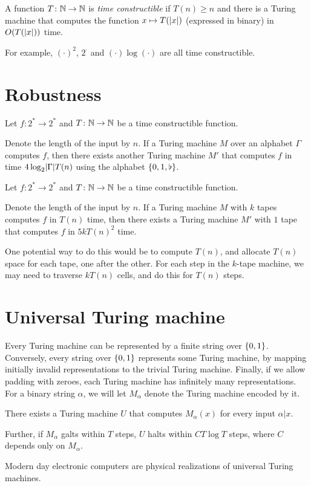 \begin{definition*} \label{def:tcf}
    A function $T\colon \mathbb{N} \to \mathbb{N}$ is \emph{time constructible} if
    $T(n) \ge n$ and there is a Turing machine that computes the function
    $x \mapsto T(\lvert x\rvert)$ (expressed in binary) in $O(T(\lvert x\rvert))$ time.
\end{definition*}
For example, $(\cdot)^2$, $2^\cdot$ and $(\cdot) \log (\cdot)$ are all
time constructible.

\section{Robustness} \label{sec:robustness}
\begin{theorem} \label{thm:binary}
    Let $f\colon 2^* \to 2^*$ and $T\colon \mathbb{N} \to \mathbb{N}$ be a time
    constructible function.

    Denote the length of the input by $n$.
    If a Turing machine $M$ over an alphabet $\Gamma$ computes $f$, then
    there exists another Turing machine $M'$ that computes $f$ in time
    $4 \log_2 \lvert\Gamma\rvert T(n)$ using the alphabet $\{0, 1, \flat\}$.
\end{theorem}

\begin{theorem} \label{thm:one-tape}
    Let $f\colon 2^* \to 2^*$ and $T\colon \mathbb{N} \to \mathbb{N}$ be a time
    constructible function.

    Denote the length of the input by $n$.
    If a Turing machine $M$ with $k$ tapes computes $f$ in $T(n)$ time,
    then there exists a Turing machine $M'$ with $1$ tape that computes $f$
    in $5 k T(n)^2$ time.
\end{theorem}
One potential way to do this would be to compute $T(n)$,
and allocate $T(n)$ space for each tape, one after the
other.
For each step in the $k$-tape machine, we may need to traverse $k T(n)$
cells, and do this for $T(n)$ steps.

\section{Universal Turing machine}
Every Turing machine can be represented by a finite string over
$\{0, 1\}$.
Conversely, every string over $\{0, 1\}$ represents some Turing machine,
by mapping initially invalid representations to the trivial Turing machine.
Finally, if we allow padding with zeroes, each Turing machine has infinitely
many representations.
For a binary string $\alpha$, we will let $M_\alpha$ denote the Turing
machine encoded by it.

\begin{theorem} \label{thm:utm}
    There exists a Turing machine $U$ that computes $M_\alpha(x)$ for
    every input $\alpha\vert x$.

    Further, if $M_\alpha$ galts within $T$ steps, $U$ halts within
    $C T \log T$ steps, where $C$ depends only on $M_\alpha$.
\end{theorem}
Modern day electronic computers are physical realizations of universal
Turing machines.
